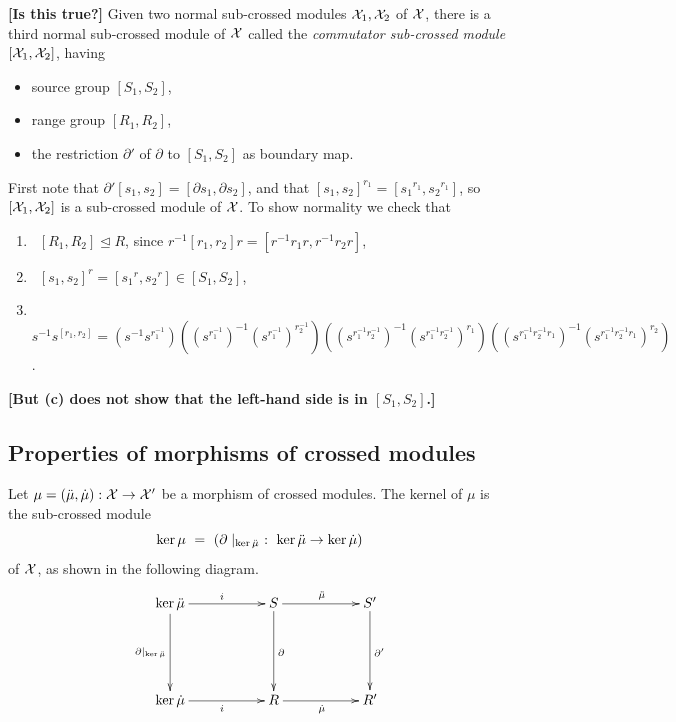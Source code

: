 \begin{prop}
{\bf [Is this true?]}\quad
Given two normal sub-crossed modules $\mathcal{X}_1, \mathcal{X}_2$ of $\mathcal{X}$, 
there is a third normal sub-crossed module of $\mathcal{X}$ 
called the \emph{commutator sub-crossed module} 
$[\mathcal{X}_1,\mathcal{X}_2]$, having
\begin{itemize}
\item source group $[S_1,S_2]$,
\item range group $[R_1,R_2]$,
\item the restriction $\partial'$ of $\partial$ to $[S_1,S_2]$ 
as boundary map. 
\end{itemize}
\end{prop}
\begin{pf}
First note that $\partial'[s_1,s_2] = [\partial s_1, \partial s_2]$, 
and that $[s_1,s_2]^{r_1} = [{s_1}^{r_1}, {s_2}^{r_1}]$, 
so $[\mathcal{X}_1,\mathcal{X}_2]$ is a sub-crossed module of $\mathcal{X}$.
To show normality we check that
\begin{enumerate}[{\rm (a)}]
\item ~$[R_1,R_2] \unlhd R$, 
since $r^{-1}[r_1,r_2]r = [r^{-1}r_1r,r^{-1}r_2r]$, 
\item ~$[s_1,s_2]^r = [{s_1}^r,{s_2}^r] \in [S_1,S_2]$,
\item ~$s^{-1}s^{[r_1,r_2]} 
  = (s^{-1}s^{r_1^{-1}})
    ((s^{r_1^{-1}})^{-1}(s^{r_1^{-1}})^{r_2^{-1}})
    ((s^{r_1^{-1}r_2^{-1}})^{-1}(s^{r_1^{-1}r_2^{-1}})^{r_1})
    ((s^{r_1^{-1}r_2^{-1}r_1})^{-1}(s^{r_1^{-1}r_2^{-1}r_1})^{r_2})$.
\end{enumerate}
{\bf [But (c) does not show that the left-hand side is in $[S_1,S_2]$.]}
\end{pf}



\subsection{Properties of morphisms of crossed modules} 
\label{subs:mor-props}

Let $\mu = (\ddot{\mu},\dot{\mu}) : \mathcal{X} \to \mathcal{X}'$  be a morphism of crossed modules.
The kernel of $\mu$ is the sub-crossed module
$$
\ker\mu ~=~ (\partial\mid_{\ker\ddot{\mu}} ~:~ \ker\ddot{\mu} \to \ker\dot{\mu})
$$
of $\mathcal{X}$, as shown in the following diagram.
$$
\xy
\xymatrix{
    \ker\ddm \ar[dd]_{\partial\mid_{\ker\ddm}}
               \ar[rr]^i
    &&    S  \ar[rr]^{\ddm} 
             \ar[dd]^{\partial} 
      &&  S' \ar[dd]^{\partial'}  \\
    &&&& \\
    \ker\dm \ar[rr]_i
    &&    R  \ar[rr]_{\dm}
      &&  R' \\ 
}
\endxy$$

